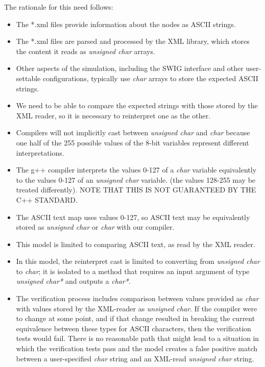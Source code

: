 \documentclass[11pt,fleqn]{report}
\begin{document}
The rationale for this need follows:
\begin{itemize}
  \item The *.xml files provide information about the nodes as ASCII strings.
  \item The *.xml files are parsed and processed by the XML library, which
  stores the content it reads as \textit{unsigned char} arrays.
  \item Other aspects of the simulation, including the SWIG interface and other
  user-settable configurations, typically use \textit{char} arrays to store the
  expected ASCII strings.
  \item We need to be able to compare the expected strings with those stored by
  the XML reader, so it is necessary to reinterpret one as the other.
  \item Compilers will not implicitly cast between \textit{unsigned char} and
  \textit{char} because one half of the 255 possible values of the 8-bit
  variables represent different interpretations.
  \item The g++ compiler interprets the values 0-127 of a \textit{char} variable
  equivalently to the values 0-127 of an \textit{unsigned char} variable.
  (the values 128-255 may be treated differently).
  NOTE THAT THIS IS NOT GUARANTEED BY THE C++ STANDARD.
  \item The ASCII text map uses values 0-127, so ASCII text may be equivalently
  stored as \textit{unsigned char} or \textit{char} with our compiler.
  \item This model is limited to comparing ASCII text, as read by the XML
  reader.
  \item In this model, the reinterpret cast is limited to converting from
  \textit{unsigned char} to \textit{char}; it is isolated to a method
  that requires an input argument of type \textit{unsigned char*} and outputs a
  \textit{char*}.
  \item The verification process includes comparison between values provided as
  \textit{char} with values stored by the XML-reader as \textit{unsigned char}.
  If the compiler were to change at some point, and if that change resulted in
  breaking the current equivalence between these types for ASCII characters,
  then the verification tests would fail. There is no reasonable path that
  might lead to a situation in which the verification tests pass and the model
  creates a false positive match between a user-specified
  \textit{char} string and an XML-read \textit{unsigned char} string.
\end{itemize}
\end{document}
